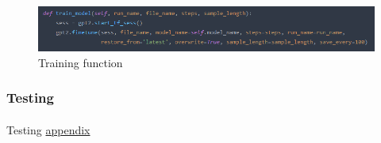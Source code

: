 \documentclass[12pt]{report}
\begin{document}
\begin{figure}[ht]
  \centering
  \includegraphics[width=1\linewidth]{img/train_model_example.png}
  \caption{Training function}
  \label{fig:train_model}
\end{figure}

\clearpage

\subsubsection*{Testing}
\paragraph{}

Testing \hyperref[appendix:model_testing]{appendix}




{}

\end{document}
